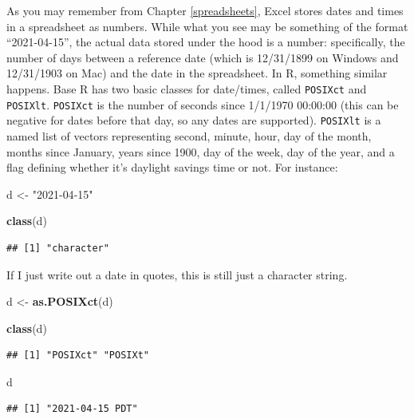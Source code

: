 \documentclass[
]{book}
\newenvironment{Shaded}{\begin{snugshade}}{\end{snugshade}}
\newcommand{\FunctionTok}[1]{\textcolor[rgb]{0.13,0.29,0.53}{\textbf{#1}}}
\newcommand{\NormalTok}[1]{#1}
\newcommand{\OtherTok}[1]{\textcolor[rgb]{0.56,0.35,0.01}{#1}}
\newcommand{\StringTok}[1]{\textcolor[rgb]{0.31,0.60,0.02}{#1}}
\begin{document}
As you may remember from Chapter \ref{spreadsheets}, Excel stores dates and times in a spreadsheet as numbers. While what you see may be something of the format ``2021-04-15'', the actual data stored under the hood is a number: specifically, the number of days between a reference date (which is 12/31/1899 on Windows and 12/31/1903 on Mac) and the date in the spreadsheet. In R, something similar happens. Base R has two basic classes for date/times, called \texttt{POSIXct} and \texttt{POSIXlt}. \texttt{POSIXct} is the number of seconds since 1/1/1970 00:00:00 (this can be negative for dates before that day, so any dates are supported). \texttt{POSIXlt} is a named list of vectors representing second, minute, hour, day of the month, months since January, years since 1900, day of the week, day of the year, and a flag defining whether it's daylight savings time or not. For instance:

\begin{Shaded}
\begin{Highlighting}[]
\NormalTok{d }\OtherTok{\textless{}{-}} \StringTok{"2021{-}04{-}15"}

\FunctionTok{class}\NormalTok{(d)}
\end{Highlighting}
\end{Shaded}

\begin{verbatim}
## [1] "character"
\end{verbatim}

If I just write out a date in quotes, this is still just a character string.

\begin{Shaded}
\begin{Highlighting}[]
\NormalTok{d }\OtherTok{\textless{}{-}} \FunctionTok{as.POSIXct}\NormalTok{(d)}

\FunctionTok{class}\NormalTok{(d)}
\end{Highlighting}
\end{Shaded}

\begin{verbatim}
## [1] "POSIXct" "POSIXt"
\end{verbatim}

\begin{Shaded}
\begin{Highlighting}[]
\NormalTok{d}
\end{Highlighting}
\end{Shaded}

\begin{verbatim}
## [1] "2021-04-15 PDT"
\end{verbatim}
\end{document}
